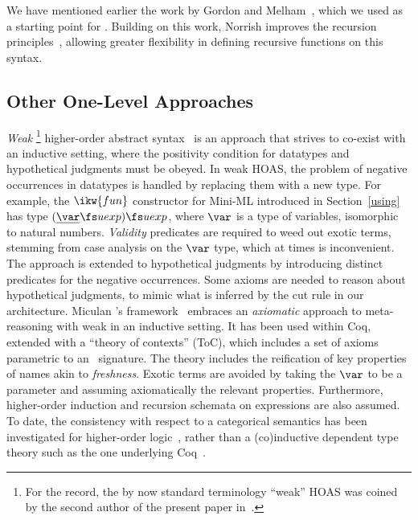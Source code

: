 \documentclass[final]{svjour3}
\begin{document}
We have mentioned earlier the work by Gordon and
Melham~\cite{Gor93,Gordon96}, which we used as a starting point for
\hybrid.
Building on this work, Norrish improves the recursion
principles~\cite{Norrish:TPHOLs04}, allowing greater flexibility in
defining recursive functions on this syntax.


\subsection{Other One-Level Approaches}
\label{ssec:oth}


\emph{Weak} \footnote{For the record, the by now standard terminology
``weak'' HOAS was coined by the second author of the present paper
in~\cite{MomTP01}.} higher-order abstract syntax~\cite{DFHtlca95} is
an approach that strives to co-exist with an inductive setting, where
the positivity condition for datatypes and hypothetical judgments must
be obeyed.  In weak HOAS, the problem of negative occurrences in
datatypes is handled by replacing them with a new type.  For example,
the $\ikw{fun}$ constructor for Mini-ML introduced in
Section~\ref{using} has type $(\underline{\var} \fs uexp)\fs uexp$,
where $\var$ is a type of variables, isomorphic to natural
numbers. \emph{Validity} predicates are required to weed out exotic
terms, stemming from case analysis on the $\var$ type, which at times
is inconvenient. The approach is extended to hypothetical judgments by
introducing distinct predicates for the negative occurrences.  Some
axioms are needed to reason about hypothetical judgments, to mimic
what is inferred by the cut rule in our architecture.  Miculan \etal's
framework~\cite{HonsellMS01,CiaffaglioneLM07,Miculan:IC01} embraces an
\emph{axiomatic} approach to meta-reasoning with weak \hoas in an
inductive setting. It has been used within Coq, extended with a
``theory of contexts'' (ToC), which includes a set of axioms
parametric to an \hoas\ signature.  The theory includes the reification
of key properties of names akin to \emph{freshness}. Exotic terms are
avoided by taking the $\var$ to be a parameter and assuming
axiomatically the relevant properties. Furthermore, higher-order induction
and recursion schemata on expressions are also assumed. To date, the
consistency with respect to a categorical semantics has been
investigated for higher-order logic~\cite{BucaloHMSH06}, rather than
\wrt a (co)inductive dependent type theory such as the one underlying
Coq~\cite{Gim98tr}. 
\end{document}
